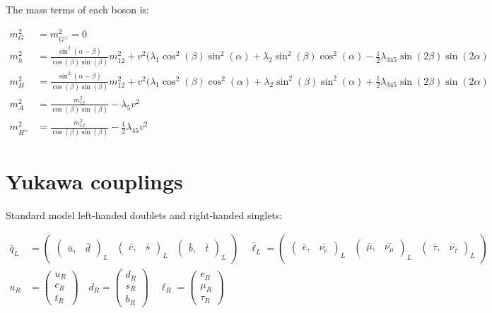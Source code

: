 \documentclass[12pt,oneside]{book}
\begin{document}
The mass terms of each boson is:

\begin{align}
    m_G^2 &= m_{G^{\pm}}^2 = 0 \\
    m_h^2 &= \frac{\sin^2(\alpha - \beta)}{\cos(\beta)\sin(\beta)}m_{12}^2 + v^2(\lambda_1 \cos^2(\beta) \sin^2(\alpha) + \lambda_2 \sin^2(\beta) \cos^2(\alpha) - \frac{1}{2} \lambda_{345} \sin(2\beta) \sin(2\alpha) \nonumber \\
    m_H^2 &= \frac{\sin^2(\alpha - \beta)}{\cos(\beta)\sin(\beta)}m_{12}^2 + v^2(\lambda_1 \cos^2(\beta) \cos^2(\alpha) + \lambda_2 \sin^2(\beta) \sin^2(\alpha) + \frac{1}{2} \lambda_{345} \sin(2\beta) \sin(2\alpha) \nonumber \\
    m_A^2 &= \frac{m_{12}^2}{\cos(\beta)\sin(\beta)} - \lambda_5v^2 \nonumber \\
    m_{H^{\pm}}^2 &= \frac{m_{12}^2}{\cos(\beta)\sin(\beta)} - \frac{1}{2}\lambda_{45} v^2 \nonumber
\end{align}

\section*{Yukawa couplings}

Standard model left-handed doublets and right-handed singlets:

\begin{align}
    \bar{q}_L &= \begin{pmatrix} {\begin{pmatrix} \bar{u}, & \bar{d} \end{pmatrix}}_{L} &  {\begin{pmatrix} \bar{c}, & \bar{s} \end{pmatrix}}_{L} & {\begin{pmatrix} \bar{b}, & \bar{t} \end{pmatrix}}_{L} \end{pmatrix} \quad \bar{\ell}_L = \begin{pmatrix} {\begin{pmatrix} \bar{e}, & \bar{\nu_e} \end{pmatrix}}_{L} &  {\begin{pmatrix} \bar{\mu}, & \bar{\nu_\mu} \end{pmatrix}}_{L} & {\begin{pmatrix} \bar{\tau}, & \bar{\nu_\tau} \end{pmatrix}}_{L} \end{pmatrix}\\
    u_R &= \begin{pmatrix} u_R \\ c_R \\ t_R \end{pmatrix} \quad d_R = \begin{pmatrix} d_R \\ s_R \\ b_R \end{pmatrix} \quad \ell_R = \begin{pmatrix} e_R \\ \mu_R \\ \tau_R \end{pmatrix}
\end{align}
\end{document}
